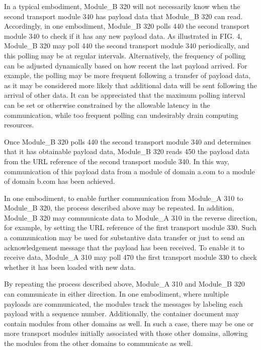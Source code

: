 In a typical embodiment, Module\_B 320
will not necessarily know when the second transport module 340
has payload data that Module\_B 320 can read. Accordingly, in
one embodiment, Module\_B 320 polls 440 the second
transport module 340 to check if it has any new payload
data. As illustrated in FIG. 4, Module\_B 320 may poll
440 the second transport module 340 periodically, and
this polling may be at regular intervals. Alternatively, the frequency
of polling can be adjusted dynamically based on how recent the last
payload arrived. For example, the polling may be more frequent
following a transfer of payload data, as it may be considered more
likely that additional data will be sent following the arrival of
other data. It can be appreciated that the maximum polling interval
can be set or otherwise constrained by the allowable latency in the
communication, while too frequent polling can undesirably drain
computing resources.



Once Module\_B 320
polls 440 the second transport module 340 and determines
that it has obtainable payload data, Module\_B 320 reads
450 the payload data from the URL reference of the second
transport module 340. In this way, communication of this
payload data from a module of domain a.com to a module of domain b.com
has been achieved.



In one embodiment, to
enable further communication from Module\_A 310 to Module\_B
320, the process described above may be repeated. In addition,
Module\_B 320 may communicate data to Module\_A 310 in the
reverse direction, for example, by setting the URL reference of the
first transport module 330. Such a communication may be used
for substantive data transfer or just to send an acknowledgement
message that the payload has been received. To enable it to receive
data, Module\_A 310 may poll 470 the first transport
module 330 to check whether it has been loaded with new data.



By repeating the process described above,
Module\_A 310 and Module\_B 320 can communicate in either
direction. In one embodiment, where multiple payloads are
communicated, the modules track the messages by labeling each payload
with a sequence number. Additionally, the container document may
contain modules from other domains as well. In such a case, there may
be one or more transport modules initially associated with those other
domains, allowing the modules from the other domains to communicate as
well.


